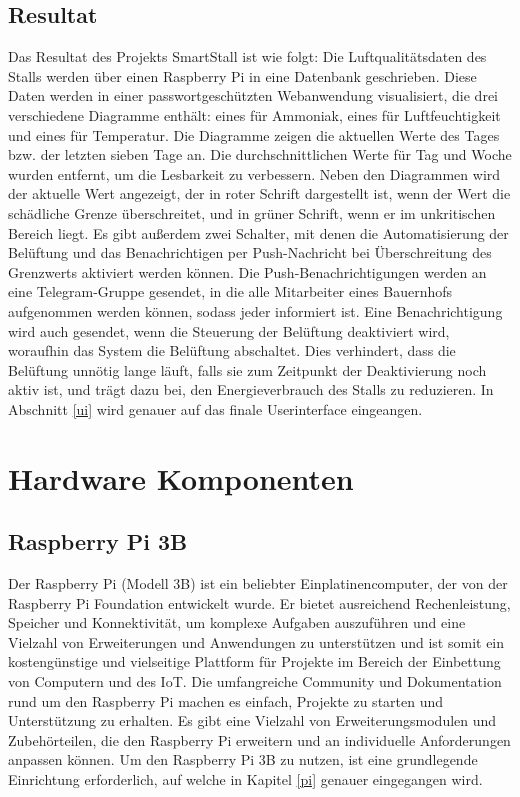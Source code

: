 \documentclass[conference]{IEEEtran}
\begin{document}
\subsection{Resultat
}Das Resultat des Projekts SmartStall ist wie folgt:
Die Luftqualitätsdaten des Stalls werden über einen Raspberry Pi in eine Datenbank geschrieben. Diese Daten werden in einer passwortgeschützten Webanwendung visualisiert, die drei verschiedene Diagramme enthält: eines für Ammoniak, eines für Luftfeuchtigkeit und eines für Temperatur. Die Diagramme zeigen die aktuellen Werte des Tages bzw. der letzten sieben Tage an. Die durchschnittlichen Werte für Tag und Woche wurden entfernt, um die Lesbarkeit zu verbessern.
Neben den Diagrammen wird der aktuelle Wert angezeigt, der in roter Schrift dargestellt ist, wenn der Wert die schädliche Grenze überschreitet, und in grüner Schrift, wenn er im unkritischen Bereich liegt. Es gibt außerdem zwei Schalter, mit denen die Automatisierung der Belüftung und das Benachrichtigen per Push-Nachricht bei Überschreitung des Grenzwerts aktiviert werden können.
Die Push-Benachrichtigungen werden an eine Telegram-Gruppe gesendet, in die alle Mitarbeiter eines Bauernhofs aufgenommen werden können, sodass jeder informiert ist. Eine Benachrichtigung wird auch gesendet, wenn die Steuerung der Belüftung deaktiviert wird, woraufhin das System die Belüftung abschaltet. Dies verhindert, dass die Belüftung unnötig lange läuft, falls sie zum Zeitpunkt der Deaktivierung noch aktiv ist, und trägt dazu bei, den Energieverbrauch des Stalls zu reduzieren. In Abschnitt \ref{ui} wird genauer auf das finale Userinterface eingeangen.



\section{Hardware Komponenten}
\subsection{Raspberry Pi 3B}
Der Raspberry Pi (Modell 3B) ist ein beliebter Einplatinencomputer, der von der Raspberry Pi Foundation entwickelt wurde. Er bietet ausreichend Rechenleistung, Speicher und Konnektivität, um komplexe Aufgaben auszuführen und eine Vielzahl von Erweiterungen und Anwendungen zu unterstützen und ist somit ein kostengünstige und vielseitige Plattform für Projekte im Bereich der Einbettung von Computern und des IoT. Die umfangreiche Community und Dokumentation rund um den Raspberry Pi machen es einfach, Projekte zu starten und Unterstützung zu erhalten. Es gibt eine Vielzahl von Erweiterungsmodulen und Zubehörteilen, die den Raspberry Pi erweitern und an individuelle Anforderungen anpassen können. Um den Raspberry Pi 3B zu nutzen, ist eine grundlegende Einrichtung erforderlich, auf welche in Kapitel \ref{pi} genauer eingegangen wird. \cite{raspy} 
\end{document}
